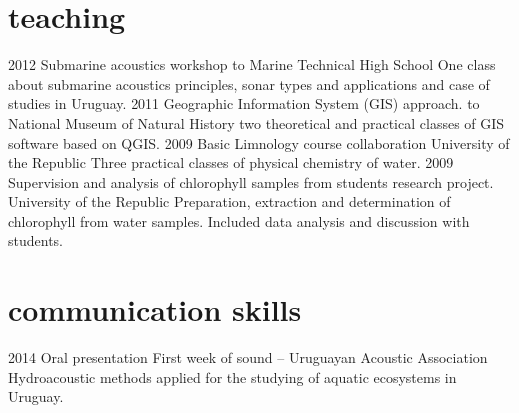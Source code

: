 \documentclass[]{friggeri-cv} %
\begin{document}
\section{teaching}
\begin{entrylist}
	\entry
	{2012}
	{Submarine acoustics workshop}
	{to Marine Technical High School}
	{One class about submarine acoustics principles, sonar types and applications and case of studies in Uruguay.}	
	\entry
	{2011}
	{Geographic Information System (GIS) approach.}
	{to National Museum of Natural History}
	{two theoretical and practical classes of GIS software based on QGIS.}	
	\entry
	{2009}
	{Basic Limnology course collaboration}
	{University of the Republic}
	{Three practical classes of physical chemistry of water.}	
	\entry
	{2009}
	{Supervision and analysis of chlorophyll samples from students research project.}
	{University of the Republic}
	{Preparation, extraction and determination of chlorophyll from water samples. Included data analysis and discussion with students.}	
\end{entrylist}

\section{communication skills}
\begin{entrylist}	
	\entry
	{2014}
	{Oral presentation}
	{First week of sound -- Uruguayan Acoustic Association}
	{Hydroacoustic methods applied for the studying of aquatic ecosystems in Uruguay.}
\end{entrylist}
\end{document}
